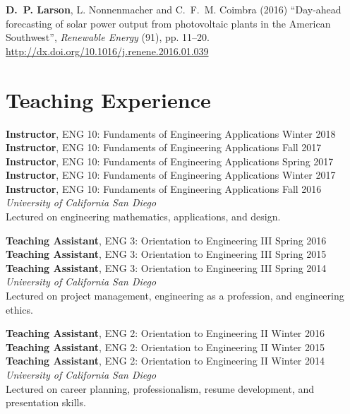 \documentclass[]{res}
\begin{document}
\begin{resume}
\textbf{D.~P. Larson}, L. Nonnenmacher and C.~F.~M. Coimbra (2016) ``Day-ahead forecasting of solar power output from photovoltaic plants in the American Southwest'', \textit{Renewable Energy} (91), pp. 11--20. \url{http://dx.doi.org/10.1016/j.renene.2016.01.039}


%


\section{Teaching Experience}
\vspace{0.1in}

\textbf{Instructor}, ENG 10: Fundaments of Engineering Applications \hfill Winter 2018 \\
\textbf{Instructor}, ENG 10: Fundaments of Engineering Applications \hfill Fall 2017 \\
\textbf{Instructor}, ENG 10: Fundaments of Engineering Applications \hfill Spring 2017 \\
\textbf{Instructor}, ENG 10: Fundaments of Engineering Applications \hfill Winter 2017 \\
\textbf{Instructor}, ENG 10: Fundaments of Engineering Applications \hfill Fall 2016 \\
\textit{University of California San Diego} \\
Lectured on engineering mathematics, applications, and design.

\textbf{Teaching Assistant}, ENG 3: Orientation to Engineering III \hfill Spring 2016 \\
\textbf{Teaching Assistant}, ENG 3: Orientation to Engineering III \hfill Spring 2015 \\
\textbf{Teaching Assistant}, ENG 3: Orientation to Engineering III \hfill Spring 2014 \\
\textit{University of California San Diego} \\
Lectured on project management, engineering as a profession, and engineering ethics.

\textbf{Teaching Assistant}, ENG 2: Orientation to Engineering II \hfill Winter 2016 \\
\textbf{Teaching Assistant}, ENG 2: Orientation to Engineering II \hfill Winter 2015 \\
\textbf{Teaching Assistant}, ENG 2: Orientation to Engineering II \hfill Winter 2014 \\
\textit{University of California San Diego} \\
Lectured on career planning, professionalism, resume development, and presentation skills.


\end{resume}
\end{document}
